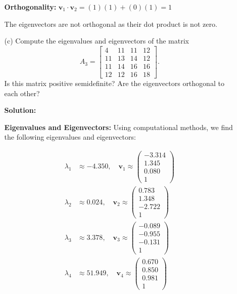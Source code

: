 \documentclass{article}
\begin{document}
\begin{enumerate}
\begin{enumerate}
    \textbf{Orthogonality:}
    $\mathbf{v}_1 \cdot \mathbf{v}_2 = (1)(1) + (0)(1) = 1$
    
    The eigenvectors are not orthogonal as their dot product is not zero.

    \item[(c)] Compute the eigenvalues and eigenvectors of the matrix
    \[
    A_3 = \begin{bmatrix}
    4 & 11 & 11 & 12 \\
    11 & 13 & 14 & 12 \\
    11 & 14 & 16 & 16 \\
    12 & 12 & 16 & 18
    \end{bmatrix}.
    \]
    Is this matrix positive semidefinite? Are the eigenvectors orthogonal to each other?

    \textbf{Solution:}

    \textbf{Eigenvalues and Eigenvectors:}
    Using computational methods, we find the following eigenvalues and eigenvectors:

    \begin{align*}
    \lambda_1 &\approx -4.350, \quad \mathbf{v}_1 \approx \begin{pmatrix} -3.314 \\ 1.345 \\ 0.080 \\ 1 \end{pmatrix} \\[10pt]
    \lambda_2 &\approx 0.024, \quad \mathbf{v}_2 \approx \begin{pmatrix} 0.783 \\ 1.348 \\ -2.722 \\ 1 \end{pmatrix} \\[10pt]
    \lambda_3 &\approx 3.378, \quad \mathbf{v}_3 \approx \begin{pmatrix} -0.089 \\ -0.955 \\ -0.131 \\ 1 \end{pmatrix} \\[10pt]
    \lambda_4 &\approx 51.949, \quad \mathbf{v}_4 \approx \begin{pmatrix} 0.670 \\ 0.850 \\ 0.981 \\ 1 \end{pmatrix}
    \end{align*}


\end{enumerate}
\end{enumerate}
\end{document}
